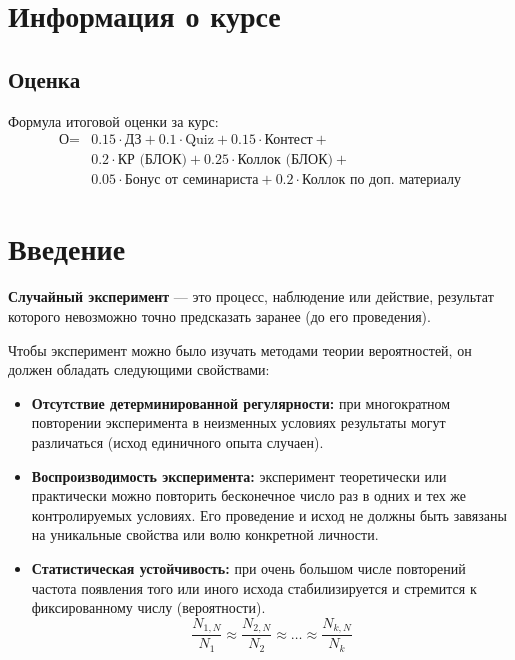 \section{Информация о курсе} 
\subsection{Оценка} 

Формула итоговой оценки за курс:
\[ 
\begin{aligned}
\text{О} ={} & 0.15 \cdot \text{ДЗ} + 0.1 \cdot \text{Quiz} + 0.15 \cdot \text{Контест} + {} \\
& 0.2 \cdot \text{КР (БЛОК)} + 0.25 \cdot \text{Коллок (БЛОК)} + {} \\
& 0.05 \cdot \text{Бонус от семинариста} + 0.2 \cdot \text{Коллок по доп.\ материалу} 
\end{aligned}
\]

\section{Введение}

\begin{definition}
    \textbf{Случайный эксперимент} --- это процесс, наблюдение или действие, результат которого невозможно точно предсказать заранее (до его проведения). 
    
    Чтобы эксперимент можно было изучать методами теории вероятностей, он должен обладать следующими свойствами:
    \begin{itemize}
        \item \textbf{Отсутствие детерминированной регулярности:} при многократном повторении эксперимента в неизменных условиях результаты могут различаться (исход единичного опыта случаен).
        \item \textbf{Воспроизводимость эксперимента:} эксперимент теоретически или практически можно повторить бесконечное число раз в одних и тех же контролируемых условиях. Его проведение и исход не должны быть завязаны на уникальные свойства или волю конкретной личности.
        \item \textbf{Статистическая устойчивость:} при очень большом числе повторений частота появления того или иного исхода стабилизируется и стремится к фиксированному числу (вероятности).
        \[
        \frac{N_{1, N}}{N_1} \approx \frac{N_{2, N}}{N_2} \approx \ldots \approx \frac{N_{k, N}}{N_k}
        \]
    \end{itemize}
\end{definition}

